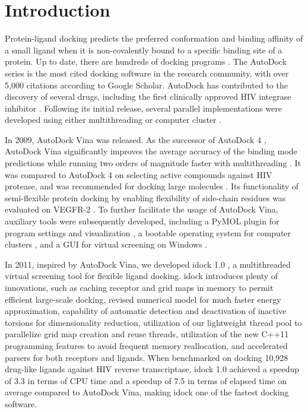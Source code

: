 \documentclass[10pt]{article}
\begin{document}

\section*{Introduction}
Protein-ligand docking predicts the preferred conformation and binding affinity of a small ligand when it is non-covalently bound to a specific binding site of a protein. Up to date, there are hundreds of docking programs \cite{493,922}. The AutoDock series \cite{597,596,595} is the most cited docking software in the research community, with over 5,000 citations according to Google Scholar. AutoDock has contributed to the discovery of several drugs, including the first clinically approved HIV integrase inhibitor \cite{1169}. Following its initial release, several parallel implementations were developed using either multithreading or computer cluster \cite{115,560,782}.

In 2009, AutoDock Vina \cite{595} was released. As the successor of AutoDock 4 \cite{596}, AutoDock Vina significantly improves the average accuracy of the binding mode predictions while running two orders of magnitude faster with multithreading \cite{595}. It was compared to AutoDock 4 on selecting active compounds against HIV protease, and was recommended for docking large molecules \cite{556}. Its functionality of semi-flexible protein docking by enabling flexibility of side-chain residues was evaluated on VEGFR-2 \cite{1084}. To further facilitate the usage of AutoDock Vina, auxiliary tools were subsequently developed, including a PyMOL \cite{1221} plugin for program settings and visualization \cite{609}, a bootable operating system for computer clusters \cite{773}, and a GUI for virtual screening on Windows \cite{1250}.

In 2011, inspired by AutoDock Vina, we developed idock 1.0 \cite{1153}, a multithreaded virtual screening tool for flexible ligand docking. idock introduces plenty of innovations, such as caching receptor and grid maps in memory to permit efficient large-scale docking, revised numerical model for much faster energy approximation, capability of automatic detection and deactivation of inactive torsions for dimensionality reduction, utilization of our lightweight thread pool to parallelize grid map creation and reuse threads, utilization of the new C++11 programming features to avoid frequent memory reallocation, and accelerated parsers for both receptors and ligands. When benchmarked on docking 10,928 drug-like ligands against HIV reverse transcriptase, idock 1.0 achieved a speedup of 3.3 in terms of CPU time and a speedup of 7.5 in terms of elapsed time on average compared to AutoDock Vina, making idock one of the fastest docking software.
\end{document}
